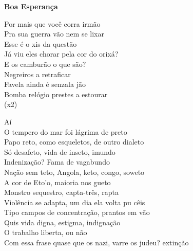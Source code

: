 \begin{center}
    \textbf{Boa Esperança}
\end{center}

\noindent
Por mais que você corra irmão\\
Pra sua guerra vão nem se lixar\\
Esse é o xis da questão\\
Já viu eles chorar pela cor do orixá?\\
E os camburão o que são?\\
Negreiros a retraficar\\
Favela ainda é senzala jão\\
Bomba relógio prestes a estourar\\
(x2)

\vspace{0.3cm}

\noindent
Aí\\
O tempero do mar foi lágrima de preto\\
Papo reto, como esqueletos, de outro dialeto\\
Só desafeto, vida de inseto, imundo\\
Indenização? Fama de vagabundo\\
Nação sem teto, Angola, keto, congo, soweto\\
A cor de Eto'o, maioria nos gueto\\
Monstro sequestro, capta-três, rapta\\
Violência se adapta, um dia ela volta pu cêis\\
Tipo campos de concentração, prantos em vão\\
Quis vida digna, estigma, indignação\\
O trabalho liberta, ou não\\
Com essa frase quase que os nazi, varre os judeu? extinção\\
[...]

\columnbreak

